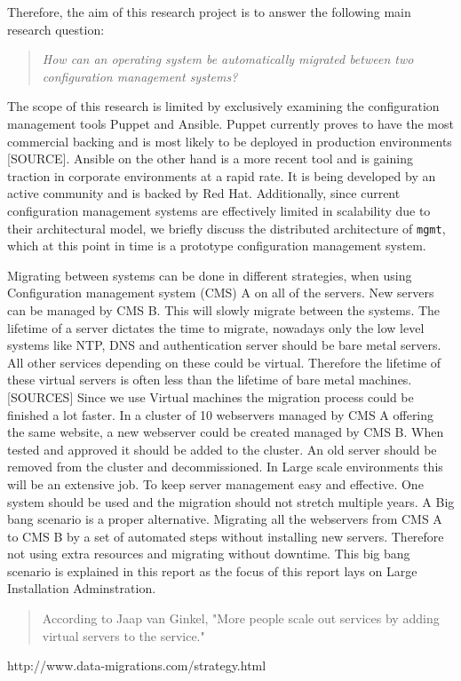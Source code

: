 Therefore, the aim of this research project is to answer the following main research question:

\begin{quote}
\textit{How can an operating system be automatically migrated between two configuration management systems?} %
\end{quote}

\noindent
The scope of this research is limited by exclusively examining the configuration management tools Puppet and Ansible. Puppet currently proves to have the most commercial backing and is most likely to be deployed in production environments [SOURCE]. Ansible on the other hand is a more recent tool and is gaining traction in corporate environments at a rapid rate. It is being developed by an active community and is backed by Red Hat. Additionally, since current configuration management systems are effectively limited in scalability due to their architectural model, we briefly discuss the distributed architecture of \texttt{mgmt}, which at this point in time is a prototype configuration management system.

Migrating between systems can be done in different strategies, when using Configuration management system (CMS) A on all of the servers. New servers can be managed by CMS B. This will slowly migrate between the systems. The lifetime of a server dictates the time to migrate, nowadays only the low level systems like NTP, DNS and authentication server should be bare metal servers. All other services depending on these could be virtual. Therefore the lifetime of these virtual servers is often less than the lifetime of bare metal machines. [SOURCES] Since we use Virtual machines the migration process could be finished a lot faster. In a cluster of 10 webservers managed by CMS A offering the same website, a new webserver could be created managed by CMS B. When tested and approved it should be added to the cluster. An old server should be removed from the cluster and decommissioned. In Large scale environments this will be an extensive job.
To keep server management easy and effective. One system should be used and the migration should not stretch multiple years. A Big bang scenario is a proper alternative. Migrating all the webservers from CMS A to CMS B by a set of automated steps without installing new servers. Therefore not using extra resources and migrating without downtime. This big bang scenario is explained in this report as the focus of this report lays on Large Installation Adminstration.

\begin{quote}
According to Jaap van Ginkel, "More people scale out services by adding virtual servers to the service." 
\end{quote}
     
http://www.data-migrations.com/strategy.html

